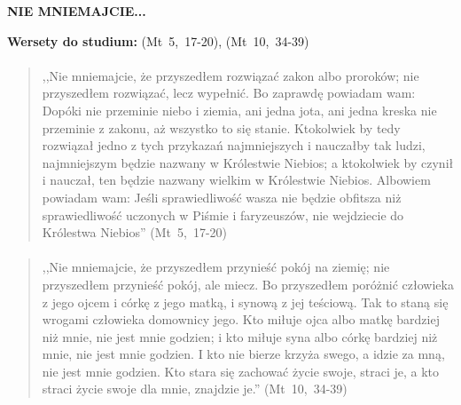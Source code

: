 \documentclass[10pt,a4paper,oneside]{article}
\begin{document}
\centerline{\textbf{\MakeUppercase{Nie mniemajcie...}}}
\begin{center}
\textbf{Wersety do studium:} 
\mbox{(Mt 5, 17-20)}, \mbox{(Mt 10, 34-39)}
\end{center}
\paragraph{}
\begin{quote}
,,Nie mniemajcie, że przyszedłem rozwiązać zakon albo proroków; nie przyszedłem rozwiązać, lecz wypełnić. Bo zaprawdę powiadam wam: Dopóki nie przeminie niebo i ziemia, ani jedna jota, ani jedna kreska nie przeminie z zakonu, aż wszystko to się stanie. Ktokolwiek by tedy rozwiązał jedno z tych przykazań najmniejszych i nauczałby tak ludzi, najmniejszym będzie nazwany w Królestwie Niebios; a ktokolwiek by czynił i nauczał, ten będzie nazwany wielkim w Królestwie Niebios. Albowiem powiadam wam: Jeśli sprawiedliwość wasza nie będzie obfitsza niż sprawiedliwość uczonych w Piśmie i faryzeuszów, nie wejdziecie do Królestwa Niebios'' \mbox{(Mt 5, 17-20)}
\end{quote}
\paragraph{}
\begin{quote}
,,Nie mniemajcie, że przyszedłem przynieść pokój na ziemię; nie przyszedłem przynieść pokój, ale miecz. Bo przyszedłem poróżnić człowieka z jego ojcem i córkę z jego matką, i synową z jej teściową. Tak to staną się wrogami człowieka domownicy jego. Kto miłuje ojca albo matkę bardziej niż mnie, nie jest mnie godzien; i kto miłuje syna albo córkę bardziej niż mnie, nie jest mnie godzien. I kto nie bierze krzyża swego, a idzie za mną, nie jest mnie godzien. Kto stara się zachować życie swoje, straci je, a kto straci życie swoje dla mnie, znajdzie je.'' \mbox{(Mt 10, 34-39)}
\end{quote}
\end{document}
